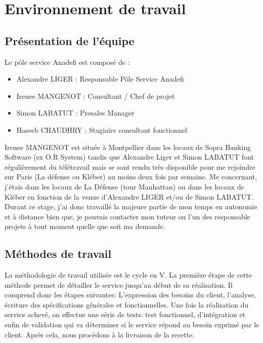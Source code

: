 \section{Environnement de travail}


\subsection{Présentation de l'équipe}

Le pôle service Anadefi est composé de :
\begin{itemize}
\item Alexandre LIGER : Responsable Pôle Service Anadefi
\item Irenee MANGENOT : Consultant / Chef de projet
\item Simon LABATUT : Presales Manager
\item Haseeb CHAUDHRY : Stagiaire consultant fonctionnel\\
\end{itemize}

Irenee MANGENOT est située à Montpellier dans les locaux de Sopra Banking Software (ex O.R System) tandis que Alexandre Liger et Simon LABATUT font régulièrement du télétravail mais se sont rendu très disponible pour me rejoindre sur Paris (La défense ou Kléber) au moins deux fois par semaine.
Me concernant, j'étais dans les locaux de La Défense (tour Manhattan) ou dans les locaux de Kléber en fonction de la venue d'Alexandre LIGER et/ou de Simon LABATUT.\\

Durant ce stage, j'ai donc travaillé la majeure partie de mon temps en autonomie et à distance bien que, je pouvais contacter mon tuteur ou l'un des responsable projets à tout moment quelle que soit ma demande.

\subsection{Méthodes de travail}

La méthodologie de travail utilisée est le cycle en V. La première étape de cette méthode permet de détailler le service jusqu'au début de sa réalisation. Il comprend donc les étapes suivantes: L'expression des besoins du client, l'analyse, écriture des spécifications générales et fonctionnelles. Une fois la réalisation du service achevé, on effectue une série de tests: test fonctionnel, d'intégration et enfin de validation qui va déterminer si le service répond au besoin exprimé par le client. Après cela, nous procédons à la livraison de la recette.\\

